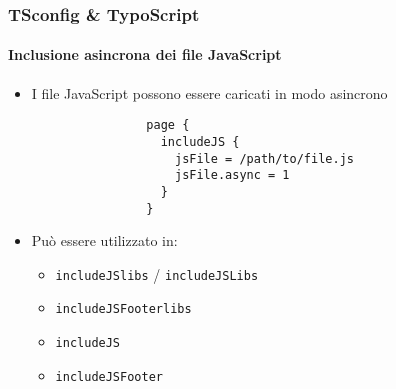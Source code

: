 
\begin{frame}[fragile]
	\frametitle{TSconfig \& TypoScript}
	\framesubtitle{Inclusione asincrona dei file JavaScript}

	\begin{itemize}
		\item I file JavaScript possono essere caricati in modo asincrono

			\begin{lstlisting}
				page {
				  includeJS {
				    jsFile = /path/to/file.js
				    jsFile.async = 1
				  }
				}
			\end{lstlisting}

		\item Può essere utilizzato in:

			\begin{itemize}
				\item \texttt{includeJSlibs} / \texttt{includeJSLibs}
				\item \texttt{includeJSFooterlibs}
				\item \texttt{includeJS}
				\item \texttt{includeJSFooter}
			\end{itemize}

	\end{itemize}

\end{frame}


